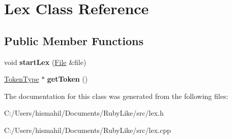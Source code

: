 \hypertarget{class_lex}{\section{Lex Class Reference}
\label{class_lex}
}
\subsection*{Public Member Functions}
\begin{DoxyCompactItemize}
\item 
\hypertarget{class_lex_a813e096370b67b475023a586632266e3}{void {\bfseries start\-Lex} (\hyperlink{class_file}{File} \&file)}\label{class_lex_a813e096370b67b475023a586632266e3}

\item 
\hypertarget{class_lex_a8b6f8ab084b0f9e61d5df289c20f18e6}{\hyperlink{class_token_type}{Token\-Type} $\ast$ {\bfseries get\-Token} ()}\label{class_lex_a8b6f8ab084b0f9e61d5df289c20f18e6}

\end{DoxyCompactItemize}


The documentation for this class was generated from the following files\-:\begin{DoxyCompactItemize}
\item 
C\-:/\-Users/hismahil/\-Documents/\-Ruby\-Like/src/lex.\-h\item 
C\-:/\-Users/hismahil/\-Documents/\-Ruby\-Like/src/lex.\-cpp\end{DoxyCompactItemize}
